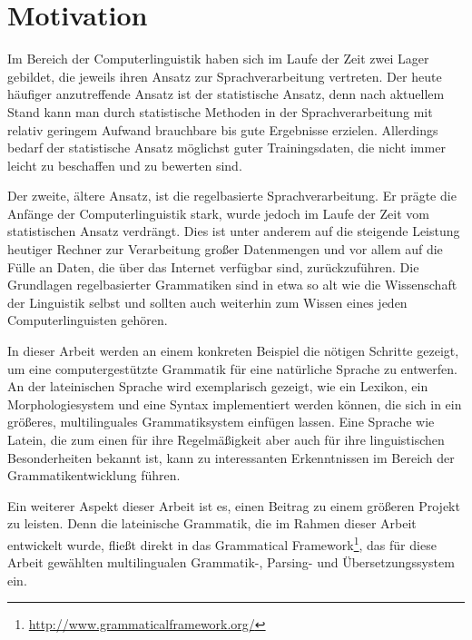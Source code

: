 \section{Motivation}
\label{sec:motivation}
Im Bereich der Computerlinguistik haben sich im Laufe der Zeit zwei Lager gebildet, die jeweils ihren Ansatz zur Sprachverarbeitung vertreten. Der heute häufiger anzutreffende Ansatz ist der statistische Ansatz, denn nach aktuellem Stand kann man durch statistische Methoden in der Sprachverarbeitung mit relativ geringem Aufwand brauchbare bis gute Ergebnisse erzielen. Allerdings bedarf der statistische Ansatz möglichst guter Trainingsdaten, die nicht immer leicht zu beschaffen und zu bewerten sind. \par
Der zweite, ältere Ansatz, ist die regelbasierte Sprachverarbeitung. Er prägte die Anfänge der Computerlinguistik stark, wurde jedoch im Laufe der Zeit vom statistischen Ansatz verdrängt. Dies ist unter anderem auf die steigende Leistung heutiger Rechner zur Verarbeitung großer Datenmengen und vor allem auf die Fülle an Daten, die über das Internet verfügbar sind, zurückzuführen. Die Grundlagen regelbasierter Grammatiken sind in etwa so alt wie die Wissenschaft der Linguistik selbst und sollten auch weiterhin zum Wissen eines jeden Computerlinguisten gehören. \par
In dieser Arbeit werden an einem konkreten Beispiel die nötigen Schritte gezeigt, um eine computergestützte Grammatik für eine natürliche Sprache zu entwerfen. An der lateinischen Sprache wird exemplarisch gezeigt, wie ein Lexikon, ein Morphologiesystem und eine Syntax implementiert werden können, die sich in ein größeres, multilinguales Grammatiksystem einfügen lassen. Eine Sprache wie Latein, die zum einen für ihre Regelmäßigkeit aber auch für ihre linguistischen Besonderheiten bekannt ist, kann zu interessanten Erkenntnissen im Bereich der Grammatikentwicklung führen. \par
Ein weiterer Aspekt dieser Arbeit ist es, einen Beitrag zu einem größeren Projekt zu leisten. Denn die lateinische Grammatik, die im Rahmen dieser Arbeit entwickelt wurde, fließt direkt in das Grammatical Framework\footnote{\url{http://www.grammaticalframework.org/}}, das für diese Arbeit gewählten multilingualen Grammatik-, Parsing- und Übersetzungssystem ein.
\pagebreak
